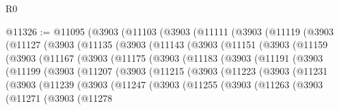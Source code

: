 \begin{lexlean}{R0}
\begin{coremodule}
@11326 := @11095
    (@3903
      (@11103
        (@3903
          (@11111
            (@3903
              (@11119
                (@3903
                  (@11127
                    (@3903
                      (@11135
                        (@3903
                          (@11143
                            (@3903
                              (@11151
                                (@3903
                                  (@11159
                                    (@3903
                                      (@11167
                                        (@3903
                                          (@11175
                                            (@3903
                                              (@11183
                                                (@3903
                                                  (@11191
                                                    (@3903
                                                      (@11199
                                                        (@3903
                                                          (@11207
                                                            (@3903
                                                              (@11215
                                                                (@3903
                                                                  (@11223
                                                                    (@3903
                                                                      (@11231
                                                                        (@3903
                                                                          (@11239
                                                                            (@3903
                                                                              (@11247
                                                                                (@3903
                                                                                  (@11255
                                                                                    (@3903
                                                                                      (@11263
                                                                                        (@3903
                                                                                          (@11271
                                                                                            (@3903
                                                                                              (@11278

\end{coremodule}
\end{lexlean}
